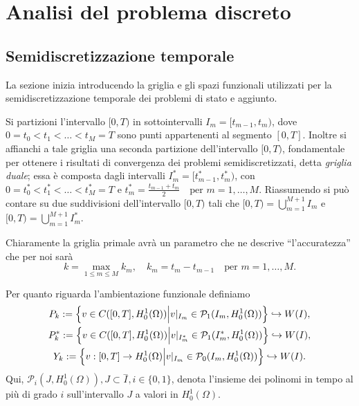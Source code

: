 \section{Analisi del problema discreto}
\label{chap:Discontinuos}

\subsection{Semidiscretizzazione temporale}
La sezione inizia introducendo la griglia e gli spazi funzionali utilizzati per la semidiscretizzazione temporale dei problemi di stato e aggiunto.

Si partizioni l'intervallo $[0,T)$ in sottointervalli $I_m=[t_{m-1},t_m)$, dove $0=t_0<t_1<\dots<t_M=T$ sono punti appartenenti al segmento $[0,T]$. Inoltre si affianchi a tale griglia una seconda partizione dell'intervallo $[0,T)$, fondamentale per ottenere i risultati di convergenza dei problemi semidiscretizzati, detta \textit{griglia duale}; essa è composta dagli intervalli $I^*_m=[t^*_{m-1},t^*_m)$, con $0=t^*_0<t^*_1<\dots<t^*_M=T$ e $t^*_m=\frac{t_{m-1}+t_m}{2}\quad\text{per $m=1,\dots,M$}$. Riassumendo si può contare su due suddivisioni dell'intervallo $[0,T)$ tali che $[0,T)=\bigcup^{M+1}_{m=1} I_m$ e $[0,T)=\bigcup^{M+1}_{m=1} I^*_m$.

Chiaramente la griglia primale avrà un parametro che ne descrive ``l'accuratezza'' che per noi sarà 
\[
k=\max_{1\le m\le M} k_m,\quad k_m=t_m-t_{m-1}\quad\text{per $m=1,\dots,M$}.
\] 

Per quanto riguarda l'ambientazione funzionale definiamo 
\begin{gather*}
P_k:=\Bigl\{v\in C([0,T],H^1_0(\Omega))\Bigl| v|_{I_{m}}\in \mathcal{P}_1(I_m,H^1_0(\Omega))\Bigr\}\hookrightarrow W(I),\\
P^*_k:=\Bigl\{v\in C([0,T],H^1_0(\Omega))\Bigl| v|_{I^*_{m}}\in \mathcal{P}_1(I^*_m,H^1_0(\Omega))\Bigr\}\hookrightarrow W(I),\\  
  Y_k:=\Bigl\{v:[0,T]\to H^1_0(\Omega)\Bigl| v|_{I_{m}}\in \mathcal{P}_0(I_m,H^1_0(\Omega))\Bigr\}\hookrightarrow W(I).
\end{gather*}
Qui, $\mathcal{P}_i(J,H^1_0(\Omega)), J\subset \overset{-}{I}, i\in\{0,1\}$, denota l'insieme dei polinomi in tempo al più di grado $i$ sull'intervallo $J$ a valori in $H^1_0(\Omega)$.



